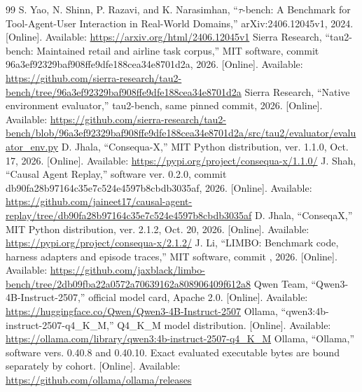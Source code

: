 \documentclass[conference]{IEEEtran}
\begin{document}
\begin{thebibliography}{99}
S. Yao, N. Shinn, P. Razavi, and K. Narasimhan, ``$\tau$-bench: A Benchmark for Tool-Agent-User Interaction in Real-World Domains,'' arXiv:2406.12045v1, 2024. [Online]. Available: \url{https://arxiv.org/html/2406.12045v1}
Sierra Research, ``tau2-bench: Maintained retail and airline task corpus,''
MIT software, commit 96a3ef92329baf908ffe9dfe188cea34e8701d2a, 2026.
[Online]. Available:
\url{https://github.com/sierra-research/tau2-bench/tree/96a3ef92329baf908ffe9dfe188cea34e8701d2a}
Sierra Research, ``Native environment evaluator,'' tau2-bench, same pinned
commit, 2026. [Online]. Available:
\url{https://github.com/sierra-research/tau2-bench/blob/96a3ef92329baf908ffe9dfe188cea34e8701d2a/src/tau2/evaluator/evaluator_env.py}
 D. Jhala, ``Consequa-X,'' MIT Python distribution,
ver. 1.1.0, Oct. 17, 2026. [Online]. Available:
\url{https://pypi.org/project/consequa-x/1.1.0/}
J. Shah, ``Causal Agent Replay,'' software ver. 0.2.0, commit
db90fa28b97164c35e7c524e4597b8cbdb3035af, 2026. [Online]. Available:
\url{https://github.com/jaineet17/causal-agent-replay/tree/db90fa28b97164c35e7c524e4597b8cbdb3035af}
 D. Jhala, ``ConseqaX,'' MIT Python distribution,
ver. 2.1.2, Oct. 20, 2026. [Online]. Available:
\url{https://pypi.org/project/consequa-x/2.1.2/}
J. Li, ``LIMBO: Benchmark code, harness adapters and episode traces,'' MIT software, commit \texttt{}, 2026. [Online]. Available: \url{https://github.com/jaxblack/limbo-bench/tree/2db09fba22a0572a70639162a808906409f612a8}
Qwen Team, ``Qwen3-4B-Instruct-2507,'' official model card, Apache 2.0. [Online]. Available: \url{https://huggingface.co/Qwen/Qwen3-4B-Instruct-2507}
Ollama, ``qwen3:4b-instruct-2507-q4\_K\_M,'' Q4\_K\_M model distribution. [Online]. Available: \url{https://ollama.com/library/qwen3:4b-instruct-2507-q4_K_M}
Ollama, ``Ollama,'' software vers. 0.40.8 and 0.40.10. Exact evaluated executable bytes are bound separately by cohort. [Online]. Available: \url{https://github.com/ollama/ollama/releases}
\end{thebibliography}
\end{document}
